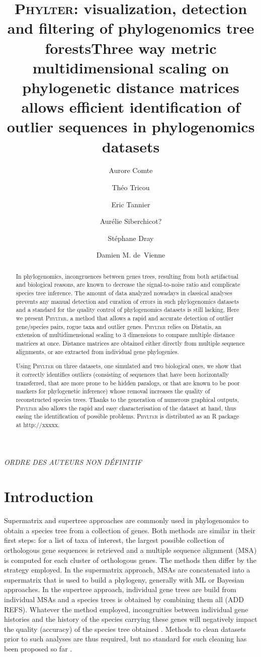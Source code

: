 \documentclass{article}
\title{\textsc{Phylter}: visualization, detection and filtering of phylogenomics tree forests}
\title{Three way metric multidimensional scaling on phylogenetic distance matrices allows efficient identification of outlier sequences in phylogenomics datasets}
\author[1]{Aurore Comte}
\author[1]{Théo Tricou}
\author[1]{Eric Tannier}
\author[1]{Aurélie Siberchicot?}
\author[1]{Stéphane Dray}
\author[1,*]{Damien M. de~Vienne}
\affil[1]{Univ Lyon, Université Lyon 1, CNRS, Laboratoire de Biométrie et Biologie Évolutive
UMR5558, F-69622 Villeurbanne, France}
\affil[*]{Corresponding author: damien.de-vienne@univ-lyon1.fr}
\date{}
\begin{document}
\maketitle

\doublespacing
\linenumbers
\textit{ORDRE DES AUTEURS NON DÉFINITIF}
\begin{abstract}
In phylogenomics, incongruences between genes trees, resulting from both artifactual and biological reasons, are known to decrease the signal-to-noise ratio and complicate species tree inference. The amount of data analyzed nowadays in classical analyses prevents any manual detection and curation of errors in such phylogenomics datasets and a standard for the quality control of phylogenomics datasets is still lacking. 
Here we present \textsc{Phylter}, a method that allows a rapid and accurate detection of outlier gene/species pairs, rogue taxa and outlier genes. \textsc{Phylter} relies on Distatis, an extension of multidimensional scaling to 3 dimensions to compare multiple distance matrices at once. Distance matrices are obtained either directly from multiple sequence alignments, or are extracted from individual gene phylogenies. 

Using \textsc{Phylter} on three datasets, one simulated and two biological ones, we show that it correctly identifies outliers (consisting of sequences that have been horizontally transferred, that are more prone to be hidden paralogs, or that are known to be poor markers for phylogenetic inference) whose removal increases the quality of reconstructed species trees. Thanks to the generation of numerous graphical outputs, \textsc{Phylter} also allows the rapid and easy characterisation of the dataset at hand, thus easing the identification of possible problems. \textsc{Phylter} is distributed as an R package at http://xxxxx. 
\end{abstract}

\section{Introduction}

Supermatrix and supertree approaches are commonly used in phylogenomics to obtain a species tree from a collection of genes. Both methods are similar in their first steps: for a list of taxa of interest, the largest possible collection of orthologous gene sequences is retrieved and a multiple sequence alignment (MSA)  is computed for each cluster of orthologous genes. The methods then differ by the strategy employed. In the supermatrix approach, MSAs are concatenated into a supermatrix that is used to build a phylogeny, generally with ML or Bayesian approaches. In the supertree approach, individual gene trees are build from individual MSAs and a species trees is obtained by combining them all (ADD REFS). 
Whatever the method employed, incongruities between individual gene histories and the history of the species carrying these genes will negatively impact the quality (accuracy) of the species tree obtained \cite{philippe2017pitfalls}. Methods to clean datasets prior to such analyses are thus required, but no standard for such cleaning has been proposed so far \cite{philippe2017pitfalls}. 
\end{document}
